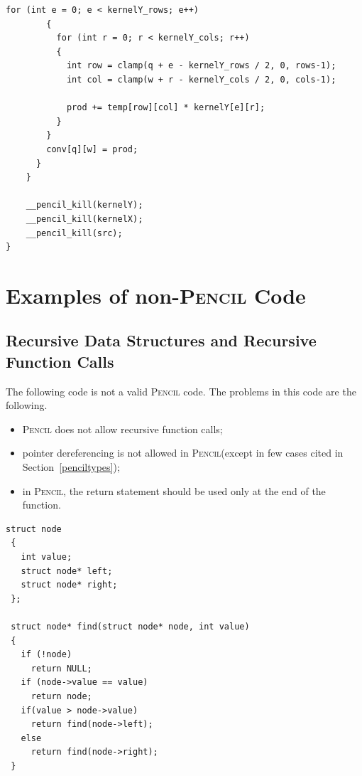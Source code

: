 \documentclass{carp}
\newcommand\pencil{\textsc{Pencil}\xspace}
\begin{document}
\begin{lstlisting}[language=pencil,escapechar=@]
        for (int e = 0; e < kernelY_rows; e++)
        {
          for (int r = 0; r < kernelY_cols; r++)
          {
            int row = clamp(q + e - kernelY_rows / 2, 0, rows-1);
            int col = clamp(w + r - kernelY_cols / 2, 0, cols-1);

            prod += temp[row][col] * kernelY[e][r];
          }
        }
        conv[q][w] = prod;
      }
    }

    __pencil_kill(kernelY);
    __pencil_kill(kernelX);
    __pencil_kill(src);
}
\end{lstlisting}


\section{Examples of non-\pencil Code}

\subsection{Recursive Data Structures and Recursive Function Calls}

The following code is not a valid \pencil code.  The problems in this
code are the following.
\begin{itemize}
  \item \pencil does not allow recursive function calls;
  \item pointer dereferencing is not allowed in \pencil (except
        in few cases cited in Section~\ref{penciltypes});
  \item in \pencil, the return statement should be used only at
        the end of the function.
\end{itemize}

\begin{lstlisting}[language=pencil]
 struct node
 {
   int value;
   struct node* left;
   struct node* right;
 };

 struct node* find(struct node* node, int value)
 {
   if (!node)
     return NULL;
   if (node->value == value)
     return node;
   if(value > node->value)
     return find(node->left);
   else
     return find(node->right);
 }
\end{lstlisting}




\end{document}
